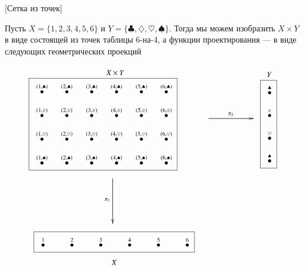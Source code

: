 \documentclass[a4paper]{book}
\newcommand{\LMO}[1]{\stackrel{#1}{\bullet}}
\theoremstyle{myth}
\newtheorem{exampleRUS}[envRUS]{\begin{russian}Пример\end{russian}}
\begin{document}
\begin{english}
\begin{exampleRUS}\label{ex:grid1}[Сетка из точек]
\begin{russian}Пусть $X=\{1,2,3,4,5,6\}$ и $Y=\{\clubsuit,\diamondsuit,\heartsuit,\spadesuit\}$. Тогда мы можем изобразить $X\times Y$ в виде состоящей из точек таблицы 6-на-4, а функции проектирования — в виде следующих геометрических проекций
\begin{align}
\parbox{2.9in}{\begin{center}\small $X\times Y$\vspace{-.1in}\end{center}\fbox{
\xymatrix@=10pt{
\LMO{(1,\clubsuit)}&\LMO{(2,\clubsuit)}&\LMO{(3,\clubsuit)}&\LMO{(4,\clubsuit)}&\LMO{(5,\clubsuit)}&\LMO{(6,\clubsuit)}\\
\LMO{(1,\diamondsuit)}&\LMO{(2,\diamondsuit)}&\LMO{(3,\diamondsuit)}&\LMO{(4,\diamondsuit)}&\LMO{(5,\diamondsuit)}&\LMO{(6,\diamondsuit)}\\
\LMO{(1,\heartsuit)}&\LMO{(2,\heartsuit)}&\LMO{(3,\heartsuit)}&\LMO{(4,\heartsuit)}&\LMO{(5,\heartsuit)}&\LMO{(6,\heartsuit)}\\
\LMO{(1,\spadesuit)}&\LMO{(2,\spadesuit)}&\LMO{(3,\spadesuit)}&\LMO{(4,\spadesuit)}&\LMO{(5,\spadesuit)}&\LMO{(6,\spadesuit)}\\
}}}
\parbox{.9in}{
\xymatrix{~\ar[rr]^{\pi_2}&&~}
}
\parbox{.3in}{\begin{center}\small $Y$\vspace{-.1in}\end{center}\fbox{
\xymatrix@=10pt{
\LMO{\clubsuit}\\\LMO{\diamondsuit}\\\LMO{\heartsuit}\\\LMO{\spadesuit}
}}}
\\\nonumber
\parbox{1in}{\hspace{-1.95in}\xymatrix{~\ar[dd]_{\pi_1}\\\\~}}
\\\nonumber
\parbox{2.9in}{\hspace{-1.2in}\fbox{
\xymatrix@=24pt{
\LMO{1}&\LMO{2}&\LMO{3}&\LMO{4}&\LMO{5}&\LMO{6}
}}\begin{center}\hspace{-2.6in}\small$X$\end{center}}
\end{align}\end{russian}
\end{exampleRUS}


\end{english}
\end{document}
